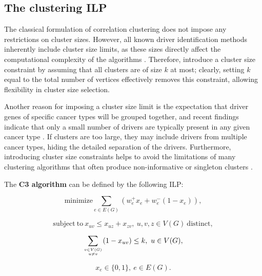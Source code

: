 \subsection{The clustering ILP}

The classical formulation of correlation clustering does not impose any restrictions on cluster sizes. However, all known driver identification methods inherently include cluster size limits, as these sizes directly affect the computational complexity of the algorithms . Therefore, \textcite{c3} introduce a cluster size constraint by assuming that all clusters are of size $k$ at most; clearly, setting $k$ equal to the total number of vertices effectively removes this constraint, allowing flexibility in cluster size selection.

Another reason for imposing a cluster size limit is the expectation that driver genes of specific cancer types will be grouped together, and recent findings indicate that only a small number of drivers are typically present in any given cancer type . If clusters are too large, they may include drivers from multiple cancer types, hiding the detailed separation of the drivers. Furthermore, introducing cluster size constraints helps to avoid the limitations of many clustering algorithms that often produce non-informative  or singleton clusters .

\begin{definition}[C3' ILP] \label{c3_ilp}
    The \textbf{C3 algorithm} can be defined by the following ILP:

    \begin{equation} \label{c3_first}
        \mathrm{minimize} \sum_{e \in E(G)} (w_e^+x_e + w_e^-(1 - x_e)),
    \end{equation}

    \begin{equation} \label{c3_second}
        \mathrm{subject \ to \ } x_{uv} \le x_{uz} + x_{zv}, \ u, v, z \in V(G) \mathrm{\ distinct},
    \end{equation}

    \begin{equation} \label{c3_third}
        \sum_{v \in V(G) \atop u \neq v} (1 - x_{uv}) \le k, \ u \in V(G),
    \end{equation}

    \begin{equation} \label{c3_fourth}
        x_e \in \{0, 1\}, \ e \in E(G).
    \end{equation}
\end{definition}

